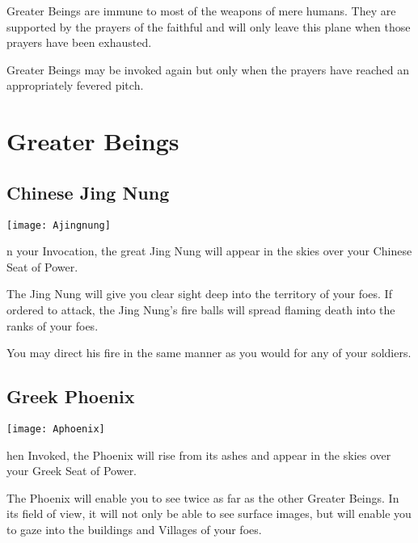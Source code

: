 Greater Beings are immune to most of the weapons of mere humans. They are supported by the prayers of the faithful and will only leave this plane when those prayers have been exhausted.

Greater Beings may be invoked again but only when the prayers have reached an appropriately fevered pitch.

\section{\textsf{Greater Beings}}

\subsection{\textsf{Chinese Jing Nung}}


\begin{center}
    \texttt{[image: Ajingnung]}
\end{center}

n your Invocation, the great Jing Nung will appear in the skies over your Chinese Seat of Power.

The Jing Nung will give you clear sight deep into the territory of your foes. If ordered to attack, the Jing Nung’s fire balls will spread flaming death into the ranks of your foes.


You may direct his fire in the same manner as you would for any of your soldiers.

\subsection{\textsf{Greek Phoenix}}


\begin{center}
    \texttt{[image: Aphoenix]}
\end{center}


hen Invoked, the Phoenix will rise from its ashes and appear in the skies over your Greek Seat of Power.

The Phoenix will enable you to see twice as far as the other Greater Beings. In its field of view, it will not only be able to see surface images, but will enable you to gaze into the buildings and Villages of your foes.

